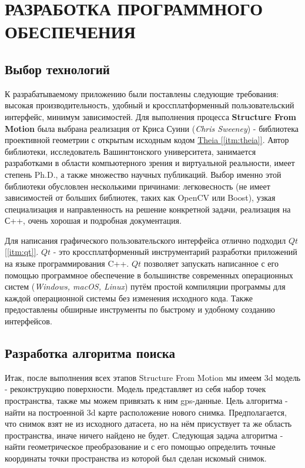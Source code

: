 \chapter{РАЗРАБОТКА ПРОГРАММНОГО ОБЕСПЕЧЕНИЯ}

\section{Выбор технологий}

К разрабатываемому приложению были поставлены следующие требования: высокая производительность, удобный и кроссплатформенный пользовательский интерфейс, минимум зависимостей. Для выполнения процесса \textbf{Structure From Motion} была выбрана реализация от Криса Суини (\textit{Chris Sweeney}) - библиотека проективной геометрии с открытым исходным кодом \hyperref[itm:theia]{Theia [\ref{itm:theia}]}. Автор библиотеки, исследователь Вашингтонского университета, занимается разработками в области компьютерного зрения и виртуальной реальности, имеет степень Ph.D., а также множество научных публикаций. Выбор именно этой библиотеки обусловлен несколькими причинами: легковесность (не имеет зависимостей от больших библиотек, таких как OpenCV или Boost), узкая специализация и направленность на решение конкретной задачи, реализация на С++, очень хорошая и подробная документация.

Для написания графического пользовательского интерфейса отлично подходил \hyperref[itm:qt]{$Qt$ [\ref{itm:qt}]}. $Qt$ - это кроссплатформенный инструментарий разработки приложений на языке программирования C++. $Qt$ позволяет запускать написанное с его помощью программное обеспечение в большинстве современных операционных систем (\textit{Windows, macOS, Linux}) путём простой компиляции программы для каждой операционной системы без изменения исходного кода. Также предоставлены обширные инструменты по быстрому и удобному созданию интерфейсов.

\section{Разработка алгоритма поиска}
Итак, после выполнения всех этапов Structure From Motion мы имеем 3d модель - реконструкцию поверхности. Модель представляет из себя набор точек пространства, также мы можем привязать к ним gps-данные. Цель алгоритма - найти на построенной 3d карте расположение нового снимка. Предполагается, что снимок взят не из исходного датасета, но на нём присуствует та же область пространства, иначе ничего найдено не будет. Следующая задача алгоритма - найти геометрическое преобразование и с его помощью определить точные координаты точки пространства из которой был сделан искомый снимок.

